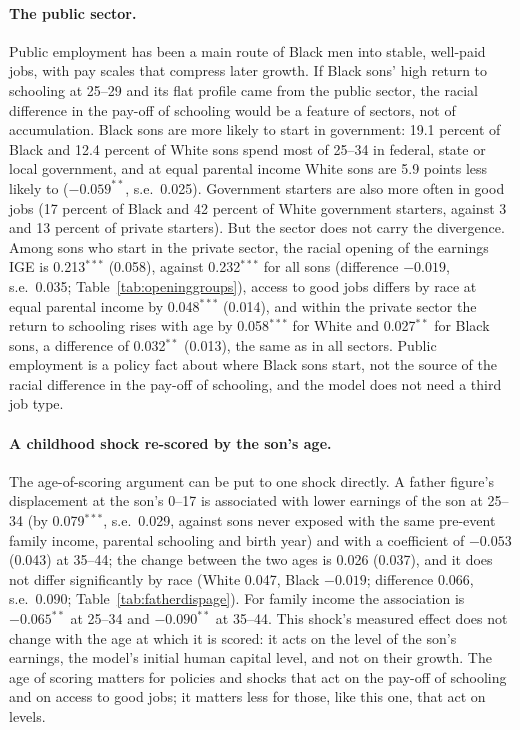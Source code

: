\paragraph{The public sector.} Public employment has been a main route of Black men into stable, well-paid jobs, with
pay scales that compress later growth. If Black sons' high return to schooling at 25--29 and its flat profile came
from the public sector, the racial difference in the pay-off of schooling would be a feature of sectors, not of
accumulation. Black sons are more likely to start in government: 19.1 percent of Black and 12.4 percent of White sons
spend most of 25--34 in federal, state or local government, and at equal parental income White sons are 5.9 points less
likely to ($-0.059^{**}$, s.e.\ 0.025). Government starters are also more often in good jobs (17
percent of Black and 42 percent of White government starters, against 3 and 13 percent of private starters). But the
sector does not carry the divergence. Among sons who start in the private sector, the racial opening of the earnings IGE
is 0.213$^{***}$ (0.058), against 0.232$^{***}$ for all sons (difference $-0.019$, s.e.\ 0.035; Table~\ref{tab:openinggroups}),
access to good jobs differs by race at equal parental income by 0.048$^{***}$ (0.014), and within the private sector the
return to schooling rises with age by 0.058$^{***}$ for White and 0.027$^{**}$ for Black sons, a difference of
0.032$^{**}$ (0.013), the same as in all sectors. Public employment is a policy fact about where Black sons start, not
the source of the racial difference in the pay-off of schooling, and the model does not need a third job type.



\paragraph{A childhood shock re-scored by the son's age.} The age-of-scoring argument can be put to one shock directly.
A father figure's displacement at the son's 0--17 is associated with lower earnings of the son at 25--34 (by 0.079$^{***}$,
s.e.\ 0.029, against sons never exposed with the same pre-event family income, parental schooling and birth year) and
with a coefficient of $-0.053$ (0.043) at 35--44; the change between the two ages is 0.026 (0.037), and it does not
differ significantly by race (White 0.047, Black $-0.019$; difference 0.066, s.e.\ 0.090; Table~\ref{tab:fatherdispage}).
For family income the association is $-0.065^{**}$ at 25--34 and $-0.090^{**}$ at 35--44. This shock's measured effect
does not change with the age at which it is scored: it acts on the level of the son's earnings, the model's initial
human capital level, and not on their growth. The age of scoring matters for policies and shocks that act on the
pay-off of schooling and on access to good jobs; it matters less for those, like this one, that act on levels.


